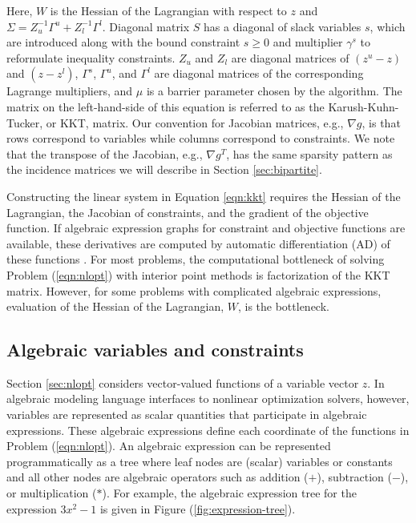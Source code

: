 \documentclass[smallextended]{svjour3}
\newcommand{\rev}[1]{{#1}}
\begin{document}
Here, $W$ is the Hessian of the Lagrangian with respect to $z$ and
$\Sigma = Z_u^{-1}\Gamma^u + Z_l^{-1}\Gamma^l$.
Diagonal matrix $S$ has a diagonal of slack variables $s$, which are
introduced along with the bound constraint $s\geq 0$ and multiplier $\gamma^s$
to reformulate inequality constraints. $Z_u$ and $Z_l$ are
diagonal matrices of $(z^u - z)$ and $(z - z^l)$, $\Gamma^s$,
$\Gamma^u$, and $\Gamma^l$ are diagonal matrices of the corresponding
Lagrange multipliers, and $\mu$ \rev{is} a barrier parameter chosen by the algorithm.
The matrix on the left-hand-side of this equation is referred to as the
Karush-Kuhn-Tucker, or KKT, matrix.
Our convention for Jacobian matrices, e.g., $\nabla g$,
is that rows correspond to variables while columns correspond to constraints.
We note that the transpose of the Jacobian, e.g., $\nabla g^T$, has the same
sparsity pattern as the incidence matrices we will describe in Section \ref{sec:bipartite}.

Constructing the linear system in Equation \ref{eqn:kkt} requires the
Hessian of the Lagrangian, the Jacobian of constraints, and the gradient
of the objective function.
If algebraic expression graphs for constraint and objective functions are available,
these derivatives are computed by automatic differentiation (AD) of these functions
\cite{griewank2008}.
For most problems, the computational bottleneck of solving \rev{Problem} (\ref{eqn:nlopt})
with interior point methods is factorization of the KKT matrix.
However, for some problems with complicated algebraic expressions, evaluation of
the Hessian of the Lagrangian, $W$, is the bottleneck.

\subsection{Algebraic variables and constraints}
Section \ref{sec:nlopt} considers vector-valued functions of a variable vector $z$.
In algebraic modeling language interfaces to nonlinear optimization solvers, however,
variables are represented as scalar quantities that participate in algebraic expressions.
These algebraic expressions define each coordinate of the functions in \rev{Problem}
(\ref{eqn:nlopt}).
An algebraic expression can be represented programmatically as a tree %
where leaf nodes are (scalar) variables or constants and all other
nodes are algebraic operators such as addition ($+$), subtraction ($-$), or multiplication ($*$).
For example, the algebraic expression tree for the expression $3x^2-1$ is given in Figure (\ref{fig:expression-tree}).
\end{document}
